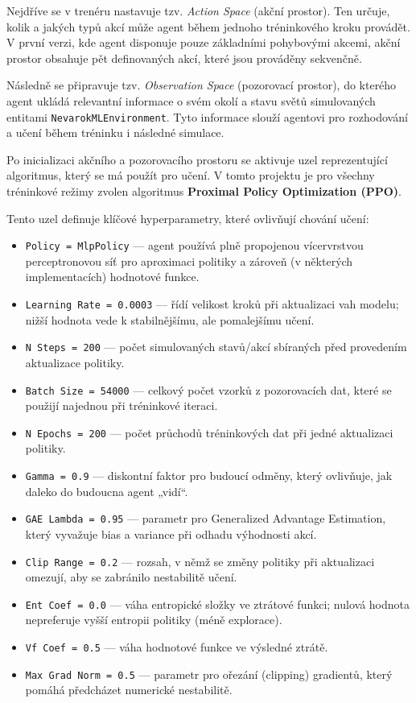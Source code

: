 Nejdříve se v trenéru nastavuje tzv. \textit{Action Space} (akční prostor). Ten určuje, kolik a jakých typů akcí může agent během jednoho tréninkového kroku provádět. V první verzi, kde agent disponuje pouze základními pohybovými akcemi, akční prostor obsahuje pět definovaných akcí, které jsou prováděny sekvenčně.

Následně se připravuje tzv. \textit{Observation Space} (pozorovací prostor), do kterého agent ukládá relevantní informace o svém okolí a stavu světů simulovaných entitami \texttt{NevarokMLEnvironment}. Tyto informace slouží agentovi pro rozhodování a učení během tréninku i následné simulace.

Po inicializaci akčního a pozorovacího prostoru se aktivuje uzel reprezentující algoritmus, který se má použít pro učení. V tomto projektu je pro všechny tréninkové režimy zvolen algoritmus \textbf{Proximal Policy Optimization (PPO)}.

\newpage

Tento uzel definuje klíčové hyperparametry, které ovlivňují chování učení:

\begin{itemize}
    \item \texttt{Policy = MlpPolicy} — agent používá plně propojenou vícervrstvou perceptronovou síť pro aproximaci politiky a zároveň (v některých implementacích) hodnotové funkce.
    \item \texttt{Learning Rate = 0.0003} — řídí velikost kroků při aktualizaci vah modelu; nižší hodnota vede k stabilnějšímu, ale pomalejšímu učení.
    \item \texttt{N Steps = 200} — počet simulovaných stavů/akcí sbíraných před provedením aktualizace politiky.
    \item \texttt{Batch Size = 54000} — celkový počet vzorků z pozorovacích dat, které se použijí najednou při tréninkové iteraci.
    \item \texttt{N Epochs = 200} — počet průchodů tréninkových dat při jedné aktualizaci politiky.
    \item \texttt{Gamma = 0.9} — diskontní faktor pro budoucí odměny, který ovlivňuje, jak daleko do budoucna agent „vidí“.
    \item \texttt{GAE Lambda = 0.95} — parametr pro Generalized Advantage Estimation, který vyvažuje bias a variance při odhadu výhodnosti akcí.
    \item \texttt{Clip Range = 0.2} — rozsah, v němž se změny politiky při aktualizaci omezují, aby se zabránilo nestabilitě učení.
    \item \texttt{Ent Coef = 0.0} — váha entropické složky ve ztrátové funkci; nulová hodnota nepreferuje vyšší entropii politiky (méně explorace).
    \item \texttt{Vf Coef = 0.5} — váha hodnotové funkce ve výsledné ztrátě.
    \item \texttt{Max Grad Norm = 0.5} — parametr pro ořezání (clipping) gradientů, který pomáhá předcházet numerické nestabilitě.
\end{itemize}

